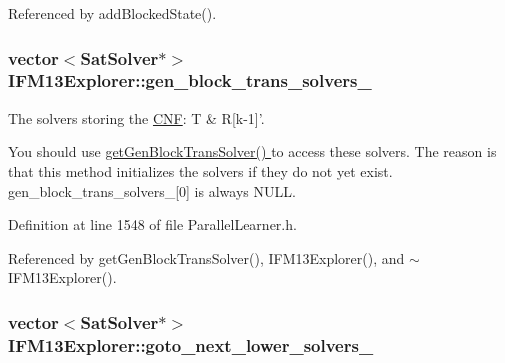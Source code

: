 Referenced by add\-Blocked\-State().

\hypertarget{classIFM13Explorer_a7cec81136159600cb4b65bbb8db0c8a5}{
\subsubsection[{gen\-\_\-block\-\_\-trans\-\_\-solvers\-\_\-}]{\setlength{\rightskip}{0pt plus 5cm}vector$<${\bf Sat\-Solver}$\ast$$>$ I\-F\-M13\-Explorer\-::gen\-\_\-block\-\_\-trans\-\_\-solvers\-\_\-\hspace{0.3cm}{\ttfamily [protected]}}}\label{classIFM13Explorer_a7cec81136159600cb4b65bbb8db0c8a5}


The solvers storing the \hyperlink{classCNF}{C\-N\-F}\-: T \& R\mbox{[}k-\/1\mbox{]}'. 

You should use \hyperlink{classIFM13Explorer_a04ebb206acd0dcf2d02f2e705eaec358}{get\-Gen\-Block\-Trans\-Solver() } to access these solvers. The reason is that this method initializes the solvers if they do not yet exist. gen\-\_\-block\-\_\-trans\-\_\-solvers\-\_\-\mbox{[}0\mbox{]} is always N\-U\-L\-L. 

Definition at line 1548 of file Parallel\-Learner.\-h.



Referenced by get\-Gen\-Block\-Trans\-Solver(), I\-F\-M13\-Explorer(), and $\sim$\-I\-F\-M13\-Explorer().

\hypertarget{classIFM13Explorer_aaa5c23d99524b6a0190212bd7abae6dd}{
\subsubsection[{goto\-\_\-next\-\_\-lower\-\_\-solvers\-\_\-}]{\setlength{\rightskip}{0pt plus 5cm}vector$<${\bf Sat\-Solver}$\ast$$>$ I\-F\-M13\-Explorer\-::goto\-\_\-next\-\_\-lower\-\_\-solvers\-\_\-\hspace{0.3cm}{\ttfamily [protected]}}}\label{classIFM13Explorer_aaa5c23d99524b6a0190212bd7abae6dd}


